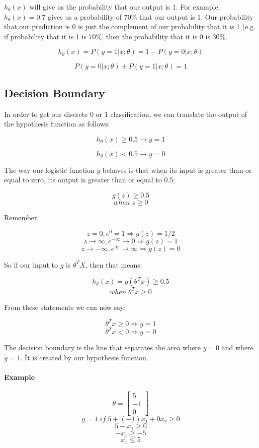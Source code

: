 \documentclass[UTF8]{article}
\begin{document}
$h_\theta(x)$ will give us the probability that our output is 1. For example, $h_\theta(x) = 0.7$ gives us a probability of $70\%$ that our output is 1. Our probability that our prediction is 0 is just the complement of our probability that it is 1 (e.g. if probability that it is 1 is $70\%$, then the probability that it is 0 is $30\%$.

\[h_\theta(x) = P(y=1 | x ; \theta) = 1 - P(y=0 | x ; \theta)\]

\[P(y = 0 | x;\theta) + P(y = 1 | x ; \theta) = 1\]

\subsection{Decision Boundary}

In order to get our discrete 0 or 1 classification, we can translate the output of the hypothesis function as follows:

\[ h_\theta(x) \geq 0.5 \rightarrow y = 1 \]

\[ h_\theta(x) < 0.5 \rightarrow y = 0 \]

The way our logistic function $g$ behaves is that when its input is greater than or equal to zero, its output is greater than or equal to 0.5:

\[ g(z) \geq 0.5 \]
\[ when \; z \geq 0 \]

Remember.

\[z=0, e^{0}=1 \Rightarrow g(z)=1/2\]
\[ z \to \infty, e^{-\infty} \to 0 \Rightarrow g(z)=1 \]
\[ z \to -\infty, e^{\infty}\to \infty \Rightarrow g(z)=0 \]

So if our input to $g$ is $\theta^TX$, then that means:

\[ h_\theta(x) = g(\theta^T x) \geq 0.5 \]
\[ when \; \theta^T x \geq 0 \]

From these statements we can now say:

\[ \theta^T x \geq 0 \Rightarrow y = 1 \]
\[ \theta^T x < 0 \Rightarrow y = 0 \]

The decision boundary is the line that separates the area where $y = 0$ and where $y = 1$. It is created by our hypothesis function.

\paragraph{Example}

\[ \theta = \begin{bmatrix}5 \\ -1 \\ 0\end{bmatrix} \]
\[ y = 1 \; if \; 5 + (-1) x_1 + 0 x_2 \geq 0 \]
\[ 5 - x_1 \geq 0 \]
\[ - x_1 \geq -5 \]
\[ x_1 \leq 5 \]
\end{document}
